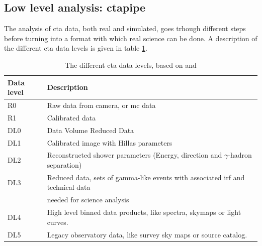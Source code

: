 \documentclass[main.tex]{subfiles}
\begin{document}
\subsection{Low level analysis: ctapipe} \label{sec:ctapipe}
The analysis of \gls{cta} data, both real and simulated, goes trhough different steps before turning into a format with which real science can be done. A description of the different \gls{cta} data levels is given in table \ref{tab:CTAdatalevels}. 


\begin{table}
  \centering
  \begin{tabular}{|l|l|}
    \hline
    Data level & Description \\
    \hline
    R0 & Raw data from camera, or \gls{mc} data\\
    R1 & Calibrated data \\
    DL0 & Data Volume Reduced Data \\
    DL1 & Calibrated image with Hillas parameters \\
    DL2 & Reconstructed shower parameters (Energy, direction and $\gamma$-hadron separation) \\
    DL3 & Reduced data, sets of gamma-like events with associated \gls{irf} and technical data\\
    & needed for science analysis \\
    DL4 & High level binned data products, like spectra, skymaps or light curves.\\
    DL5 & Legacy observatory data, like survey sky maps or source catalog. \\
    \hline
  \end{tabular}
  \caption{The different \gls{cta} data levels, based on \cite{ctapipe} and \cite{2015CTAdata}}
  \label{tab:CTAdatalevels}
\end{table}
\end{document}
